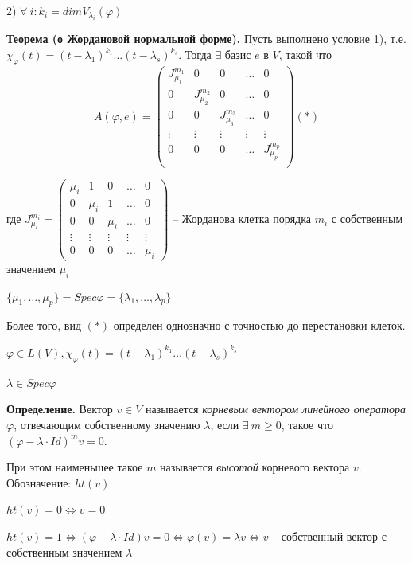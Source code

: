 2) $\forall \ i: k_i = dim V_{\lambda_i} (\varphi)$

\bigskip
\textbf{Теорема (о Жордановой нормальной форме).} Пусть выполнено условие 1), т.е. $\chi_{\varphi} (t) = (t - \lambda_1)^{k_1} \dots (t - \lambda_s)^{k_s}$. Тогда $\exists$ базис $e$ в $V$, такой что \begin{equation*}A(\varphi, e) = \left(
\begin{array}{c|c|c|c|c}
  J^{m_1}_{\mu_1} & 0 & 0 & \dots & 0  \\
  \hline
  0 & J^{m_2}_{\mu_2} & 0 & \dots & 0  \\
  \hline
  0 & 0 & J^{m_3}_{\mu_3} & \dots & 0 \\
  \hline
  \vdots & \vdots & \vdots & \vdots & \vdots \\
  \hline
  0 & 0 & 0 & \dots & J^{m_p}_{\mu_p} \\
\end{array}
\right) (*)\end{equation*}

где $J^{m_i}_{\mu_i} = \begin{pmatrix} \mu_i & 1 & 0 & \dots & 0 \\ 0 & \mu_i & 1 & \dots & 0 \\ 0 & 0 & \mu_i & \dots & 0
\\ \vdots & \vdots & \vdots & \vdots & \vdots \\ 0 & 0 & 0 & \dots & \mu_i \end{pmatrix}$ -- Жорданова клетка порядка $m_i$ с собственным значением $\mu_i$

$\{\mu_1, \dots, \mu_p\} = Spec \varphi = \{\lambda_1, \dots, \lambda_p\}$

\bigskip
Более того, вид $(*)$ определен однозначно с точностью до перестановки клеток.

\bigskip
$\varphi \in L(V), \chi_{\varphi} (t) = (t - \lambda_1)^{k_1} \dots (t - \lambda_s)^{k_s}$

$\lambda \in Spec \varphi$

\bigskip
\textbf{Определение.} Вектор $v \in V$ называется \textit{корневым вектором линейного оператора} $\varphi$, отвечающим собственному значению $\lambda$, если $\exists \ m \geqslant 0$, такое что $(\varphi - \lambda \cdot Id)^m v = 0$.

При этом наименьшее такое $m$ называется \textit{высотой} корневого вектора $v$. Обозначение: $ht(v)$

\bigskip
$ht(v) = 0 \Leftrightarrow v = 0$

$ht(v) = 1 \Leftrightarrow (\varphi - \lambda \cdot Id) v = 0 \Leftrightarrow \varphi(v) = \lambda v \Leftrightarrow v$ -- собственный вектор с собственным значением $\lambda$

